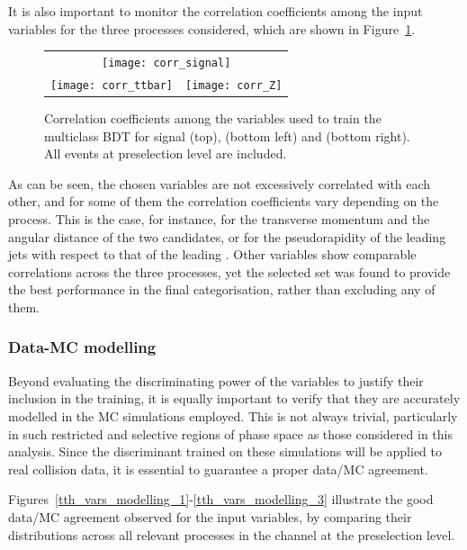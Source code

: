   It is also important to monitor the correlation coefficients among the input variables for the three processes considered, which are shown in Figure~\ref{tth_vars_corr}.
  \begin{figure}[htbp]
    \centering
    \setlength{\tabcolsep}{2pt}
    \renewcommand{\arraystretch}{0}
  
    \begin{tabular}{@{}c c@{}}
      \multicolumn{2}{c}{\texttt{[image: corr\_signal]}} \\[6pt]
      \texttt{[image: corr\_ttbar]} &
      \texttt{[image: corr\_Z]}
    \end{tabular}
  
    \caption{Correlation coefficients among the variables used to train the multiclass BDT for signal (top), \ttbar (bottom left) and \ztautau (bottom right). All events at preselection level are included.}
    \label{tth_vars_corr}
  \end{figure}
  As can be seen, the chosen variables are not excessively correlated with each other, and for some of them the correlation coefficients vary depending on the process. This is the case, for instance, for the transverse momentum and the angular distance of the two \tauhad candidates, or for the pseudorapidity of the leading jets with respect to that of the leading \tauhad. Other variables show comparable correlations across the three processes, yet the selected set was found to provide the best performance in the final categorisation, rather than excluding any of them.
  
\FloatBarrier
\subsubsection*{Data-MC modelling}

Beyond evaluating the discriminating power of the variables to justify their inclusion in the training, it is equally important to verify that they are accurately modelled in the MC simulations employed. This is not always trivial, particularly in such restricted and selective regions of phase space as those considered in this analysis. Since the discriminant trained on these simulations will be applied to real collision data, it is essential to guarantee a proper data/MC agreement.  

Figures~\ref{tth_vars_modelling_1}-\ref{tth_vars_modelling_3} illustrate the good data/MC agreement observed for the input variables, by comparing their distributions across all relevant processes in the channel at the \ttH preselection level.

